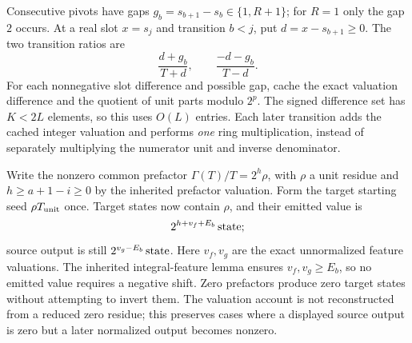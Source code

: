 \documentclass[11pt,letterpaper]{article}
\theoremstyle{remark}\newtheorem{remark}[theorem]{Remark}
\begin{document}
Consecutive pivots have gaps $g_b=s_{b+1}-s_b\in\{1,R+1\}$; for $R=1$
only the gap $2$ occurs. At a real slot $x=s_j$ and transition $b<j$, put
$d=x-s_{b+1}\ge0$. The two transition ratios are
\[
 \frac{d+g_b}{T+d},\qquad\frac{-d-g_b}{T-d}.
\]
For each nonnegative slot difference and possible gap, cache the exact valuation
difference and the quotient of unit parts modulo $2^p$. The signed difference
set has $K<2L$ elements, so this uses $O(L)$ entries. Each later transition
adds the cached integer valuation and performs \emph{one} ring multiplication,
instead of separately multiplying the numerator unit and inverse denominator.

Write the nonzero common prefactor $\Gamma(T)/T=2^h\rho$, with $\rho$ a unit
residue and $h\ge a+1-i\ge0$ by the inherited prefactor valuation. Form the target starting seed $\rho T_{\rm unit}$
once. Target states now contain $\rho$, and their emitted value is
\[
 2^{h+v_f+E_b}\,\hbox{state};
\]
source output is still $2^{v_g-E_b}\,\hbox{state}$. Here $v_f,v_g$ are the
exact unnormalized feature valuations. The inherited integral-feature lemma
ensures $v_f,v_g\ge E_b$, so no emitted value requires a negative shift.
Zero prefactors produce zero target states without attempting to invert them.
The valuation account is not reconstructed from a reduced zero residue; this
preserves cases where a displayed source output is zero but a later normalized
output becomes nonzero.
\end{document}
